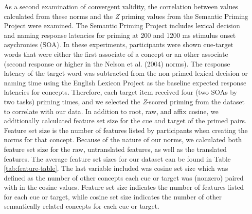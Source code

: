 \documentclass[english,man]{apa6}
\theoremstyle{definition}
\theoremstyle{definition}
\theoremstyle{definition}
\theoremstyle{remark}
\begin{document}
As a second examination of convergent validity, the correlation between
values calculated from these norms and the \emph{Z} priming values from
the Semantic Priming Project were examined. The Semantic Priming Project
includes lexical decision and naming response latencies for priming at
200 and 1200 ms stimulus onset asychronies (SOA). In these experiments,
participants were shown cue-target words that were either the first
associate of a concept or an other associate (second response or higher
in the Nelson et al. (2004) norms). The response latency of the target
word was subtracted from the non-primed lexical decision or naming time
using the English Lexicon Project as the baseline expected response
latencies for concepts. Therefore, each target item received four (two
SOAs by two tasks) priming times, and we selected the \emph{Z}-scored
priming from the dataset to correlate with our data. In addition to
root, raw, and affix cosine, we additionally calculated feature set size
for the cue and target of the primed pairs. Feature set size is the
number of features listed by participants when creating the norms for
that concept. Because of the nature of our norms, we calculated both
feature set size for the raw, untranslated features, as well as the
translated features. The average feature set sizes for our dataset can
be found in Table \ref{tab:feature-table}. The last variable included
was cosine set size which was defined as the number of other concepts
each cue or target was (nonzero) paired with in the cosine values.
Feature set size indicates the number of features listed for each cue or
target, while cosine set size indicates the number of other semantically
related concepts for each cue or target.
\end{document}
